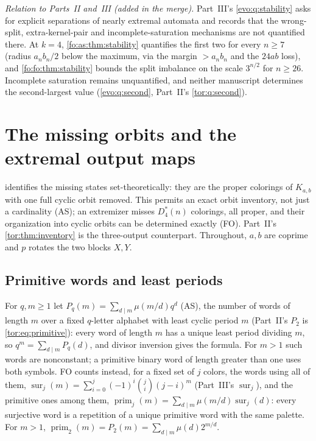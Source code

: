 \documentclass[11pt,a4paper]{article}
\numberwithin{equation}{section}
\theoremstyle{definition}
\theoremstyle{remark}
\newcommand{\sur}{\operatorname{sur}}
\begin{document}
\emph{Relation to Parts~II and~III (added in the merge).} Part~III's
\cref{evo:q:stability} asks for explicit separations of nearly extremal
automata and records that the wrong-split, extra-kernel-pair and
incomplete-saturation mechanisms are not quantified there. At $k=4$,
\cref{fo:as:thm:stability} quantifies the first two for every $n\ge7$ (radius
$a_nb_n/2$ below the maximum, via the margin $>a_nb_n$ and the $24ab$ loss), and
\cref{fo:fo:thm:stability} bounds the split imbalance on the scale
$3^{n/2}$ for $n\ge26$. Incomplete saturation remains unquantified, and
neither manuscript determines the second-largest value
(\cref{evo:q:second}, Part~II's \cref{tor:q:second}).

\section{The missing orbits and the extremal output maps}\label{fo:sec:inventory}

 identifies the missing states set-theoretically: they
are the proper colorings of $K_{a,b}$ with one full cyclic orbit removed. This
permits an exact orbit inventory, not just a cardinality (AS); an extremizer
misses $D^*_4(n)$ colorings, all proper, and their organization into cyclic
orbits can be determined exactly (FO). Part~II's \cref{tor:thm:inventory} is
the three-output counterpart. Throughout, $a,b$ are coprime and $p$ rotates
the two blocks $X,Y$.

\subsection{Primitive words and least periods}

For $q,m\ge1$ let $P_q(m)=\sum_{d\mid m}\mu(m/d)q^d$ (AS), the number of words
of length $m$ over a fixed $q$-letter alphabet with least cyclic period $m$
(Part~II's $P_2$ is \eqref{tor:eq:primitive}): every word of length $m$ has a
unique least period dividing $m$, so $q^m=\sum_{d\mid m}P_q(d)$, and divisor
inversion gives the formula. For $m>1$ such words are nonconstant; a primitive
binary word of length greater than one uses both symbols. FO counts instead,
for a fixed set of $j$ colors, the words using all of them,
$\sur_j(m)=\sum_{i=0}^j(-1)^i\binom ji(j-i)^m$ (Part~III's $\sur_j$), and the
primitive ones among them,
$\operatorname{prim}_j(m)=\sum_{d\mid m}\mu(m/d)\sur_j(d)$: every surjective
word is a repetition of a unique primitive word with the same palette. For
$m>1$, $\operatorname{prim}_2(m)=P_2(m)=\sum_{d\mid m}\mu(d)2^{m/d}$.
\end{document}
